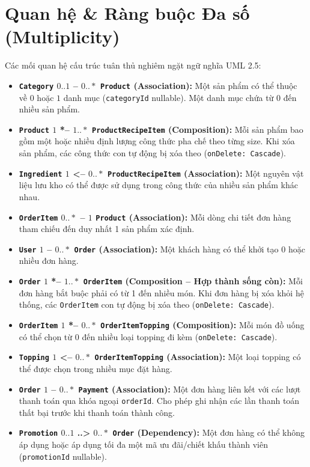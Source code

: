 \documentclass[12pt,a4paper]{article}
\begin{document}
\section{Quan hệ \& Ràng buộc Đa số (Multiplicity)}

Các mối quan hệ cấu trúc tuân thủ nghiêm ngặt ngữ nghĩa UML 2.5:

\begin{itemize}[leftmargin=*,itemsep=3pt]
    \item \textbf{\texttt{Category} $0..1$ -- $0..*$ \texttt{Product} (Association):} Một sản phẩm có thể thuộc về $0$ hoặc $1$ danh mục (\texttt{categoryId} nullable). Một danh mục chứa từ $0$ đến nhiều sản phẩm.
    \item \textbf{\texttt{Product} $1$ *-- $1..*$ \texttt{ProductRecipeItem} (Composition):} Mỗi sản phẩm bao gồm một hoặc nhiều định lượng công thức pha chế theo từng size. Khi xóa sản phẩm, các công thức con tự động bị xóa theo (\texttt{onDelete: Cascade}).
    \item \textbf{\texttt{Ingredient} $1$ <-- $0..*$ \texttt{ProductRecipeItem} (Association):} Một nguyên vật liệu lưu kho có thể được sử dụng trong công thức của nhiều sản phẩm khác nhau.
    \item \textbf{\texttt{OrderItem} $0..*$ -- $1$ \texttt{Product} (Association):} Mỗi dòng chi tiết đơn hàng tham chiếu đến duy nhất 1 sản phẩm xác định.
    \item \textbf{\texttt{User} $1$ -- $0..*$ \texttt{Order} (Association):} Một khách hàng có thể khởi tạo $0$ hoặc nhiều đơn hàng.
    \item \textbf{\texttt{Order} $1$ *-- $1..*$ \texttt{OrderItem} (Composition -- Hợp thành sống còn):} Mỗi đơn hàng bắt buộc phải có từ 1 đến nhiều món. Khi đơn hàng bị xóa khỏi hệ thống, các \texttt{OrderItem} con tự động bị xóa theo (\texttt{onDelete: Cascade}).
    \item \textbf{\texttt{OrderItem} $1$ *-- $0..*$ \texttt{OrderItemTopping} (Composition):} Mỗi món đồ uống có thể chọn từ 0 đến nhiều loại topping đi kèm (\texttt{onDelete: Cascade}).
    \item \textbf{\texttt{Topping} $1$ <-- $0..*$ \texttt{OrderItemTopping} (Association):} Một loại topping có thể được chọn trong nhiều mục đặt hàng.
    \item \textbf{\texttt{Order} $1$ -- $0..*$ \texttt{Payment} (Association):} Một đơn hàng liên kết với các lượt thanh toán qua khóa ngoại \texttt{orderId}. Cho phép ghi nhận các lần thanh toán thất bại trước khi thanh toán thành công.
    \item \textbf{\texttt{Promotion} $0..1$ ..> $0..*$ \texttt{Order} (Dependency):} Một đơn hàng có thể không áp dụng hoặc áp dụng tối đa một mã ưu đãi/chiết khấu thành viên (\texttt{promotionId} nullable).

\end{itemize}
\end{document}
